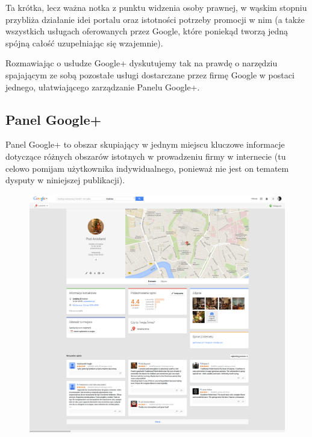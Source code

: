 Ta krótka, lecz ważna notka z punktu widzenia osoby prawnej, w wąskim stopniu przybliża działanie idei portalu oraz istotności potrzeby promocji w nim (a także wszystkich usługach oferowanych przez Google, które poniekąd tworzą jedną spójną całość uzupełniając się wzajemnie). 

Rozmawiając o usłudze Google+ dyskutujemy tak na prawdę o narzędziu spajającym ze sobą pozostałe usługi dostarczane przez firmę Google w postaci jednego, ułatwiającego zarządzanie Panelu Google+.


\subsection{Panel Google+}
Panel Google+ to obszar skupiający w jednym miejscu kluczowe informacje dotyczące różnych obszarów istotnych w prowadzeniu firmy w internecie (tu celowo pomijam użytkownika indywidualnego, ponieważ nie jest on tematem dysputy w niniejszej publikacji).\\

\begin{figure}[!h]
\centering
    \scalebox{0.21}
    {
        \includegraphics{images/pod-aniolami-google-plus.png}
    }
    \label{fig:sample-google-plus-company-profile-page}
\end{figure}

